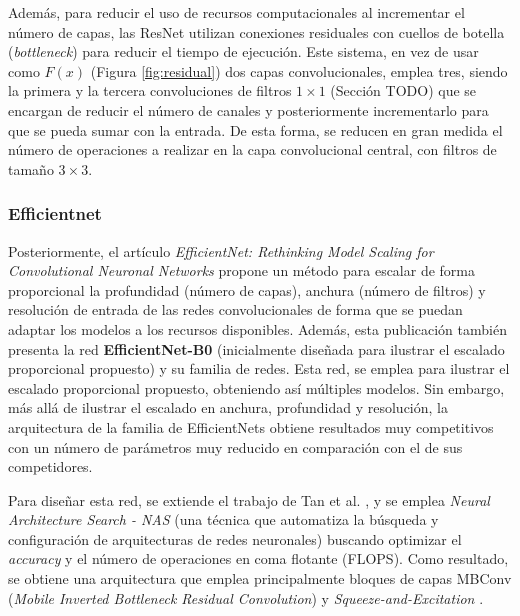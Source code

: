 Además, para reducir el uso de recursos computacionales al incrementar el número de capas, las ResNet utilizan conexiones residuales con cuellos de botella (\textit{bottleneck}) para reducir el tiempo de ejecución. Este sistema, en vez de usar como $F(x)$ (Figura \ref{fig:residual}) dos capas convolucionales, emplea tres, siendo la primera y la tercera convoluciones de filtros $1\times1$ (Sección TODO) que se encargan de reducir el número de canales y posteriormente incrementarlo para que se pueda sumar con la entrada. De esta forma, se reducen en gran medida el número de operaciones a realizar en la capa convolucional central, con filtros de tamaño $3\times3$. 



\subsubsection{Efficientnet}
Posteriormente, el artículo \textit{EfficientNet: Rethinking Model Scaling for Convolutional Neuronal Networks} \cite{efficientnet} propone un método para escalar de forma proporcional la profundidad (número de capas), anchura (número de filtros) y resolución de entrada de las redes convolucionales de forma que se puedan adaptar los modelos a los recursos disponibles. Además, esta publicación también presenta la red \textbf{EfficientNet-B0} (inicialmente diseñada para ilustrar el escalado proporcional propuesto) y su familia de redes. Esta red, se emplea para ilustrar el escalado proporcional propuesto, obteniendo así múltiples modelos. Sin embargo, más allá de ilustrar el escalado en anchura, profundidad y resolución, la arquitectura de la familia de EfficientNets obtiene resultados muy competitivos con un número de parámetros muy reducido en comparación con el de sus competidores.

Para diseñar esta red, se extiende el trabajo de Tan et al. \cite{}, y se emplea \textit{Neural Architecture Search - NAS} (una técnica que automatiza la búsqueda y configuración de arquitecturas de redes neuronales) buscando optimizar el \textit{accuracy}  y el número de operaciones en coma flotante (FLOPS). Como resultado, se obtiene una arquitectura que emplea principalmente bloques de capas MBConv (\textit{Mobile Inverted Bottleneck Residual Convolution}) \cite{mobilenetv2} y \textit{Squeeze-and-Excitation} \cite{squeeze and excitation}.

